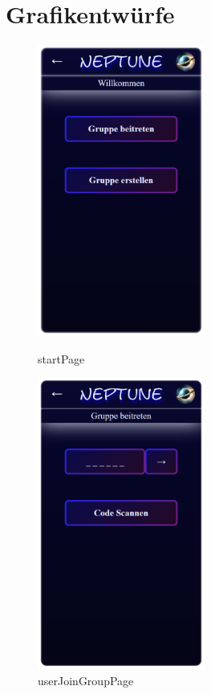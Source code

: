 \documentclass[oneside, ngerman]{sdqtechreport}
\begin{document}
\section{Grafikentwürfe}
\label{sec:Benutzeroberfläche:Grafikentwürfe}

\begin{figure}
   \begin{minipage}[b]{.4\linewidth} %
      \includegraphics[width=5.5cm]{LATEX/Pflichtenheft/GraphicDesigns/startPage.png}
      \caption{startPage}
   \end{minipage}
   \hspace{2cm}%
   \begin{minipage}[b]{.4\linewidth} %
      \includegraphics[width=5.5cm]{LATEX/Pflichtenheft/GraphicDesigns/userJoinGroupPage.png}
      \caption{userJoinGroupPage}
   \end{minipage}
   

\end{figure}
\end{document}
